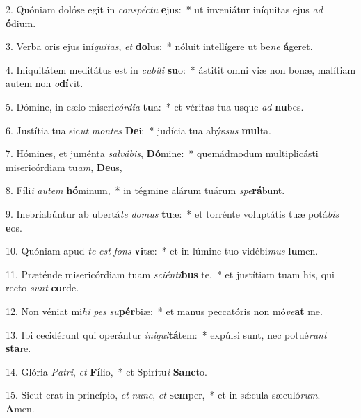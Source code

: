2. Quóniam dolóse egit in \textit{con}\textit{spéc}\textit{tu} \textbf{e}jus:~*  ut inveniátur iníquitas ejus \textit{ad} \textbf{ó}dium.\

3. Verba oris ejus iní\textit{qui}\textit{tas}, \textit{et} \textbf{do}lus:~*  nóluit intellígere ut be\textit{ne} \textbf{á}geret.\

4. Iniquitátem meditátus est in \textit{cu}\textit{bí}\textit{li} \textbf{su}o:~*  ástitit omni viæ non bonæ, malítiam autem non \textit{o}\textbf{dí}vit.\

5. Dómine, in cælo miseri\textit{cór}\textit{di}\textit{a} \textbf{tu}a:~*  et véritas tua usque \textit{ad} \textbf{nu}bes.\

6. Justítia tua sic\textit{ut} \textit{mon}\textit{tes} \textbf{De}i:~*  judícia tua abýs\textit{sus} \textbf{mul}ta.\

7. Hómines, et juménta \textit{sal}\textit{vá}\textit{bis}, \textbf{Dó}mine:~*  quemádmodum multiplicásti misericórdiam tu\textit{am}, \textbf{De}us,\

8. Fíli\textit{i} \textit{au}\textit{tem} \textbf{hó}minum,~*  in tégmine alárum tuárum \textit{spe}\textbf{rá}bunt.\

9. Inebriabúntur ab ubertá\textit{te} \textit{do}\textit{mus} \textbf{tu}æ:~*  et torrénte voluptátis tuæ potá\textit{bis} \textbf{e}os.\

10. Quóniam apud \textit{te} \textit{est} \textit{fons} \textbf{vi}tæ:~*  et in lúmine tuo vidébi\textit{mus} \textbf{lu}men.\

11. Præténde misericórdiam tuam \textit{sci}\textit{én}\textit{ti}\textbf{bus} te,~*  et justítiam tuam his, qui recto \textit{sunt} \textbf{cor}de.\

12. Non véniat mi\textit{hi} \textit{pes} \textit{su}\textbf{pér}biæ:~*  et manus peccatóris non mó\textit{ve}\textbf{at} me.\

13. Ibi cecidérunt qui operántur \textit{in}\textit{i}\textit{qui}\textbf{tá}tem:~*  expúlsi sunt, nec potué\textit{runt} \textbf{sta}re.\

14. Glória \textit{Pa}\textit{tri}, \textit{et} \textbf{Fí}lio,~*  et Spirítu\textit{i} \textbf{Sanc}to.\

15. Sicut erat in princípio, \textit{et} \textit{nunc}, \textit{et} \textbf{sem}per,~*  et in sǽcula sæculó\textit{rum}. \textbf{A}men.\

